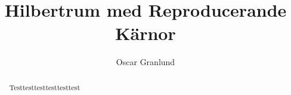 \documentclass[a4paper]{report}
\title{Hilbertrum med Reproducerande Kärnor}
\author{Oscar Granlund}
\begin{document}
\maketitle

\begin{abstract}
	Testtesttesttesttesttest
\end{abstract}
\end{document}

